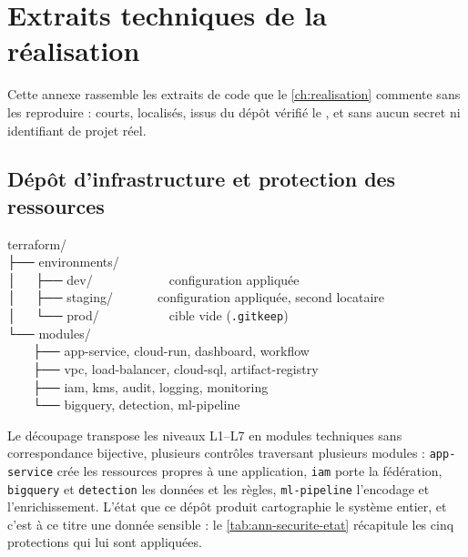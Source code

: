 \chapter{Extraits techniques de la réalisation}
\label{ann:extraits-realisation}

Cette annexe rassemble les extraits de code que le \cref{ch:realisation} commente sans les
reproduire : courts, localisés, issus du dépôt vérifié le \dateref, et sans aucun secret ni
identifiant de projet réel.

\section{Dépôt d'infrastructure et protection des ressources}

\begin{extraitconf}[boxsep=1pt, left=3pt, right=3pt, top=2pt, bottom=2pt]
terraform/\\
├── environments/\\
│\ \ \ ├── dev/\ \ \ \ \ \ \ \ \ \ \ \ configuration appliquée\\
│\ \ \ ├── staging/\ \ \ \ \ \ \ configuration appliquée, second locataire\\
│\ \ \ └── prod/\ \ \ \ \ \ \ \ \ \ \ cible vide (\texttt{.gitkeep})\\
└── modules/\\
\ \ \ \ ├── app-service, cloud-run, dashboard, workflow\\
\ \ \ \ ├── vpc, load-balancer, cloud-sql, artifact-registry\\
\ \ \ \ ├── iam, kms, audit, logging, monitoring\\
\ \ \ \ └── bigquery, detection, ml-pipeline
\end{extraitconf}

Le découpage transpose les niveaux L1--L7 en modules techniques sans correspondance bijective,
plusieurs contrôles traversant plusieurs modules : \texttt{app-service} crée les ressources propres
à une application, \texttt{iam} porte la fédération, \texttt{bigquery} et \texttt{detection} les
données et les règles, \texttt{ml-pipeline} l'encodage et l'enrichissement. L'état que ce dépôt
produit cartographie le système entier, et c'est à ce titre une donnée sensible : le
\cref{tab:ann-securite-etat} récapitule les cinq protections qui lui sont appliquées.

